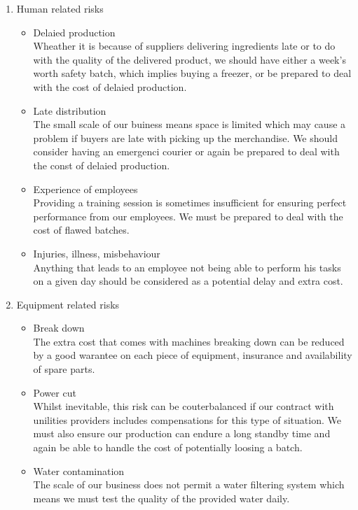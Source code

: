 \documentclass[11pt]{article}
\begin{document}
  \begin{enumerate}
  \item Human related risks
    \begin{itemize}
    \item Delaied production \\ Wheather it is because of suppliers delivering ingredients late or to do with the quality of the delivered product, we should have either a week's worth safety batch, which implies buying a freezer, or be prepared to deal with the cost of delaied production.
    \item Late distribution \\
The small scale of our buiness means space is limited which may cause a problem if buyers are late with picking up the merchandise. We should consider having an emergenci courier  or again be prepared to deal with the const of delaied production.
    \item Experience of employees \\
Providing a training session is sometimes insufficient for ensuring perfect performance from our employees. We must be prepared to deal with the cost of flawed batches.
    \item Injuries, illness, misbehaviour \\
Anything that leads to an employee not being able to perform his tasks on a given day should be considered as a potential delay and extra cost.
    \end{itemize}

  \item Equipment related risks
    \begin{itemize}
    \item Break down \\
The extra cost that comes with machines breaking down can be reduced by a good warantee on each piece of equipment, insurance and availability of spare parts.
    \item Power cut \\
Whilst inevitable, this risk can be couterbalanced if our contract with unilities providers includes compensations for this type of situation. We must also ensure our production can endure a long standby time and again be able to handle the cost of potentially loosing a batch.
    \item Water contamination \\
The scale of our business does not permit a water filtering system which means we must test the quality of the provided water daily.
    \end{itemize}


\end{enumerate}
\end{document}
